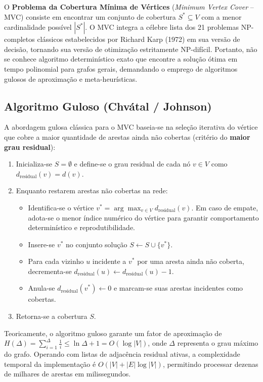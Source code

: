 \documentclass[12pt,a4paper]{article}
\begin{document}
O \textbf{Problema da Cobertura Mínima de Vértices} (\textit{Minimum Vertex Cover} -- MVC) consiste em encontrar um conjunto de cobertura $S^* \subseteq V$ com a menor cardinalidade possível $|S^*|$. O MVC integra a célebre lista dos 21 problemas NP-completos clássicos estabelecidos por Richard Karp (1972) em sua versão de decisão, tornando sua versão de otimização estritamente NP-difícil. Portanto, não se conhece algoritmo determinístico exato que encontre a solução ótima em tempo polinomial para grafos gerais, demandando o emprego de algoritmos gulosos de aproximação e meta-heurísticas.

\subsection{Algoritmo Guloso (Chvátal / Johnson)}
A abordagem gulosa clássica para o MVC baseia-se na seleção iterativa do vértice que cobre a maior quantidade de arestas ainda não cobertas (critério do \textbf{maior grau residual}):
\begin{enumerate}
    \item Inicializa-se $S = \emptyset$ e define-se o grau residual de cada nó $v \in V$ como $d_{\text{residual}}(v) = d(v)$.
    \item Enquanto restarem arestas não cobertas na rede:
    \begin{itemize}
        \item Identifica-se o vértice $v^* = \arg\max_{v \in V} d_{\text{residual}}(v)$. Em caso de empate, adota-se o menor índice numérico do vértice para garantir comportamento determinístico e reprodutibilidade.
        \item Insere-se $v^*$ no conjunto solução $S \leftarrow S \cup \{v^*\}$.
        \item Para cada vizinho $u$ incidente a $v^*$ por uma aresta ainda não coberta, decrementa-se $d_{\text{residual}}(u) \leftarrow d_{\text{residual}}(u) - 1$.
        \item Anula-se $d_{\text{residual}}(v^*) \leftarrow 0$ e marcam-se suas arestas incidentes como cobertas.
    \end{itemize}
    \item Retorna-se a cobertura $S$.
\end{enumerate}

Teoricamente, o algoritmo guloso garante um fator de aproximação de $H(\Delta) = \sum_{i=1}^\Delta \frac{1}{i} \le \ln \Delta + 1 = O(\log |V|)$, onde $\Delta$ representa o grau máximo do grafo. Operando com listas de adjacência residual ativas, a complexidade temporal da implementação é $O(|V| + |E| \log |V|)$, permitindo processar dezenas de milhares de arestas em milissegundos.
\end{document}
